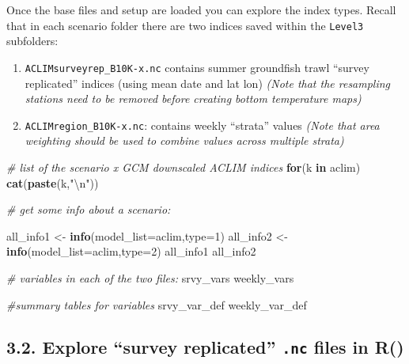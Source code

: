 \documentclass[
]{article}
\newenvironment{Shaded}{\begin{snugshade}}{\end{snugshade}}
\newcommand{\CharTok}[1]{\textcolor[rgb]{0.31,0.60,0.02}{#1}}
\newcommand{\CommentTok}[1]{\textcolor[rgb]{0.56,0.35,0.01}{\textit{#1}}}
\newcommand{\ControlFlowTok}[1]{\textcolor[rgb]{0.13,0.29,0.53}{\textbf{#1}}}
\newcommand{\DataTypeTok}[1]{\textcolor[rgb]{0.13,0.29,0.53}{#1}}
\newcommand{\DecValTok}[1]{\textcolor[rgb]{0.00,0.00,0.81}{#1}}
\newcommand{\KeywordTok}[1]{\textcolor[rgb]{0.13,0.29,0.53}{\textbf{#1}}}
\newcommand{\NormalTok}[1]{#1}
\newcommand{\StringTok}[1]{\textcolor[rgb]{0.31,0.60,0.02}{#1}}
\providecommand{\tightlist}{%
  \setlength{\itemsep}{0pt}\setlength{\parskip}{0pt}}
\begin{document}
Once the base files and setup are loaded you can explore the index
types. Recall that in each scenario folder there are two indices saved
within the \texttt{Level3} subfolders:

\begin{enumerate}
\def\labelenumi{\arabic{enumi})}
\tightlist
\item
  \texttt{ACLIMsurveyrep\_B10K-x.nc} contains summer groundfish trawl
  ``survey replicated'' indices (using mean date and lat lon)
  \emph{(Note that the resampling stations need to be removed before
  creating bottom temperature maps)}\\
\item
  \texttt{ACLIMregion\_B10K-x.nc}: contains weekly ``strata'' values
  \emph{(Note that area weighting should be used to combine values
  across multiple strata)}
\end{enumerate}

\begin{Shaded}
\begin{Highlighting}[]
    \CommentTok{# list of the scenario x GCM downscaled ACLIM indices}
    \ControlFlowTok{for}\NormalTok{(k }\ControlFlowTok{in}\NormalTok{ aclim)}
     \KeywordTok{cat}\NormalTok{(}\KeywordTok{paste}\NormalTok{(k,}\StringTok{"}\CharTok{\textbackslash{}n}\StringTok{"}\NormalTok{))}
  
    \CommentTok{# get some info about a scenario:}
  
\NormalTok{    all_info1 <-}\StringTok{ }\KeywordTok{info}\NormalTok{(}\DataTypeTok{model_list=}\NormalTok{aclim,}\DataTypeTok{type=}\DecValTok{1}\NormalTok{)}
\NormalTok{    all_info2 <-}\StringTok{ }\KeywordTok{info}\NormalTok{(}\DataTypeTok{model_list=}\NormalTok{aclim,}\DataTypeTok{type=}\DecValTok{2}\NormalTok{)}
\NormalTok{    all_info1}
\NormalTok{    all_info2}
   
    \CommentTok{# variables in each of the two files:}
\NormalTok{    srvy_vars}
\NormalTok{    weekly_vars}
  
    \CommentTok{#summary tables for variables}
\NormalTok{    srvy_var_def}
\NormalTok{    weekly_var_def}
\end{Highlighting}
\end{Shaded}

\hypertarget{explore-survey-replicated-.nc-files-in-r}{%
\subsection{\texorpdfstring{3.2. Explore ``survey replicated''
\texttt{.nc} files in
R()}{3.2. Explore ``survey replicated'' .nc files in R()}}\label{explore-survey-replicated-.nc-files-in-r}}
\end{document}
